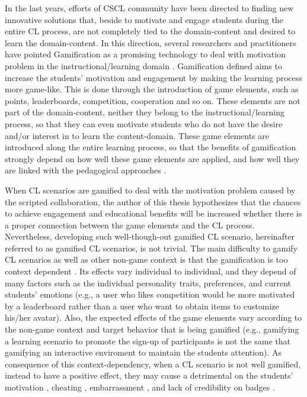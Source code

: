 In the last years, efforts of CSCL community have been directed to finding new innovative solutions that, beside to motivate and engage students during the entire CL process, are not completely tied to the domain-content and desired to learn the domain-content. In this direction, several researchers and practitioners have pointed Gamification as a promising technology to deal with motivation problem in the instructional/learning domain \cite{ChallcoMoreiraMizoguchiIsotani2014, SeabornFels2015, BorgesDurelliReisIsotani2014}.
Gamification defined  \cite{DeterdingDixonKhaledNacke2011} aims to increase the students' motivation and engagement by making the learning process more game-like. This is done through the introduction of game elements, such as points, leaderboards, competition, cooperation and so on. These elements are not part of the domain-content, neither they belong to the instructional/learning process, so that they can even motivate students who do not have the desire and/or interest in to learn the content-domain. These game elements are introduced along the entire learning process, so that the benefits of gamification strongly depend on how well these game elements are applied, and how well they are linked with the pedagogical approaches \cite{Kapp2012, KnutasIkonenNikulaPorras2014}.

When CL scenarios are gamified to deal with the motivation problem caused by the scripted collaboration, the author of this thesis hypothesizes that the chances to achieve engagement and educational benefits will be increased whether there is a proper connection between the game elements and the CL process. Nevertheless, developing such well-though-out gamified CL scenario, hereinafter referred to as gamified CL scenarios, is not trivial. The main difficulty to gamify CL scenarios as well as other non-game context is that the gamification is too context dependent \cite{HamariKoivistoSarsa2014, RichardsThompsonGraham2014}. Its effects vary individual to individual, and they depend of many factors such as the individual personality traits, preferences, and current students’ emotions \cite{Nicholson2015, PedroLopesPratesVassilevaIsotani2015} (e.g., a user who likes competition would be more motivated by a leaderboard rather than a user who want to obtain items to customize his/her avatar). Also, the expected effects of the game elements vary according to the non-game context and target behavior that is being gamified \cite{DeterdingBjorkNackeDixonLawley2013, HeeterLeeMedlerMagerko2011} (e.g., gamifying a learning scenario to promote the sign-up of participants is not the same that gamifying an interactive enviroment to maintain the students attention). As consequence of this context-dependency, when a CL scenario is not well gamified, instead to have a positive effect, they may cause a detrimental on the students’ motivation \cite{AndradeMizoguchiIsotani2016}, cheating \cite{NunesBittencourtIsotaniJaques2016}, embarrassment \cite{OhnoYamasakiTokiwa2013}, and lack of credibility on badges \cite{DavisSingh2015}.

